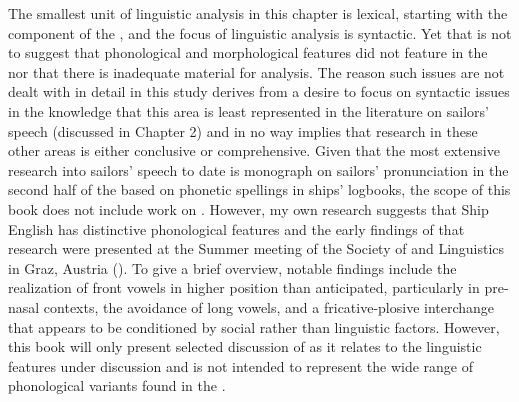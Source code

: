 The smallest unit of linguistic analysis in this chapter is lexical, starting with the  component of the , and the focus of linguistic analysis is syntactic. Yet that is not to suggest that phonological and morphological features did not feature in the  nor that there is inadequate material for analysis. The reason  such issues are not dealt with in detail in this study derives from a desire to focus on syntactic issues in the knowledge that this area is least represented in the literature on sailors’ speech (discussed in Chapter 2) and in no way implies that research in these other areas is either conclusive or comprehensive. Given that the most extensive research into sailors’ speech to date is  monograph on sailors’ pronunciation in the second half of the  based on phonetic spellings in ships’ logbooks, the scope of this book does not include work on . However, my own research suggests that Ship English has distinctive phonological features and the early findings of that research were presented at the Summer meeting of the Society of  and  Linguistics in Graz, Austria (\citealt{Delgado2015}). To give a brief overview, notable findings include the realization of front vowels in higher position than anticipated, particularly in pre-nasal contexts, the avoidance of long vowels, and a fricative-plosive interchange that appears to be conditioned by social rather than linguistic factors. However, this book will only present selected discussion of  as it relates to the linguistic features under discussion and is not intended to represent the wide range of phonological variants found in the . 
